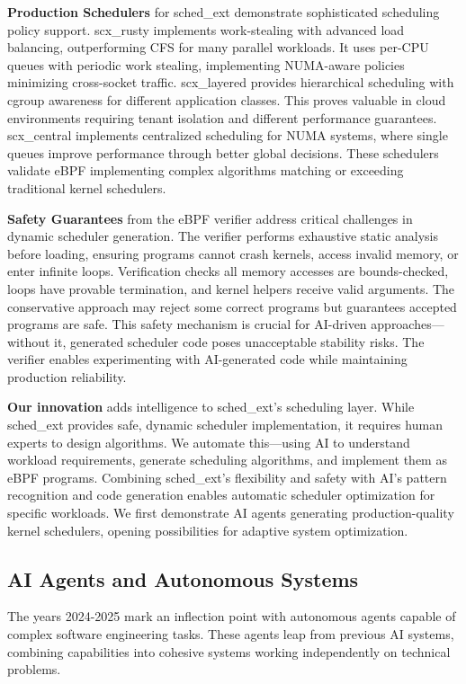 \textbf{Production Schedulers} for sched\_ext demonstrate sophisticated scheduling policy support. scx\_rusty implements work-stealing with advanced load balancing, outperforming CFS for many parallel workloads. It uses per-CPU queues with periodic work stealing, implementing NUMA-aware policies minimizing cross-socket traffic. scx\_layered provides hierarchical scheduling with cgroup awareness for different application classes. This proves valuable in cloud environments requiring tenant isolation and different performance guarantees. scx\_central implements centralized scheduling for NUMA systems, where single queues improve performance through better global decisions. These schedulers validate eBPF implementing complex algorithms matching or exceeding traditional kernel schedulers.

\textbf{Safety Guarantees} from the eBPF verifier address critical challenges in dynamic scheduler generation. The verifier performs exhaustive static analysis before loading, ensuring programs cannot crash kernels, access invalid memory, or enter infinite loops. Verification checks all memory accesses are bounds-checked, loops have provable termination, and kernel helpers receive valid arguments. The conservative approach may reject some correct programs but guarantees accepted programs are safe. This safety mechanism is crucial for AI-driven approaches—without it, generated scheduler code poses unacceptable stability risks. The verifier enables experimenting with AI-generated code while maintaining production reliability.

\textbf{Our innovation} adds intelligence to sched\_ext's scheduling layer. While sched\_ext provides safe, dynamic scheduler implementation, it requires human experts to design algorithms. We automate this—using AI to understand workload requirements, generate scheduling algorithms, and implement them as eBPF programs. Combining sched\_ext's flexibility and safety with AI's pattern recognition and code generation enables automatic scheduler optimization for specific workloads. We first demonstrate AI agents generating production-quality kernel schedulers, opening possibilities for adaptive system optimization.

\subsection{AI Agents and Autonomous Systems}

The years 2024-2025 mark an inflection point with autonomous agents capable of complex software engineering tasks. These agents leap from previous AI systems, combining capabilities into cohesive systems working independently on technical problems.

